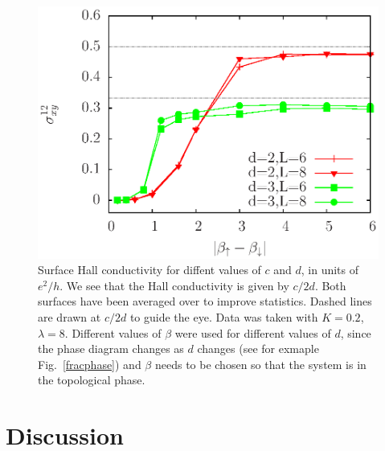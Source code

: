 \documentclass[prb,twocolumn]{revtex4-1}
\begin{document}
\begin{figure}
\includegraphics[angle=-90,width=0.9\linewidth]{figures/halldiff.eps}
\caption{Surface Hall conductivity for diffent values of $c$ and $d$, in units of $e^2/h$. We see that the Hall conductivity is given by $c/2d$. Both surfaces have been averaged over to improve statistics. Dashed lines are drawn at $c/2d$ to guide the eye. Data was taken with $K=0.2$, $\lambda=8$. Different values of $\beta$ were used for different values of $d$, since the phase diagram changes as $d$ changes (see for exmaple Fig.~\ref{fracphase}) and $\beta$ needs to be chosen so that the system is in the topological phase.}
\label{halldiff}
\end{figure}


\section{Discussion}


\end{document}
